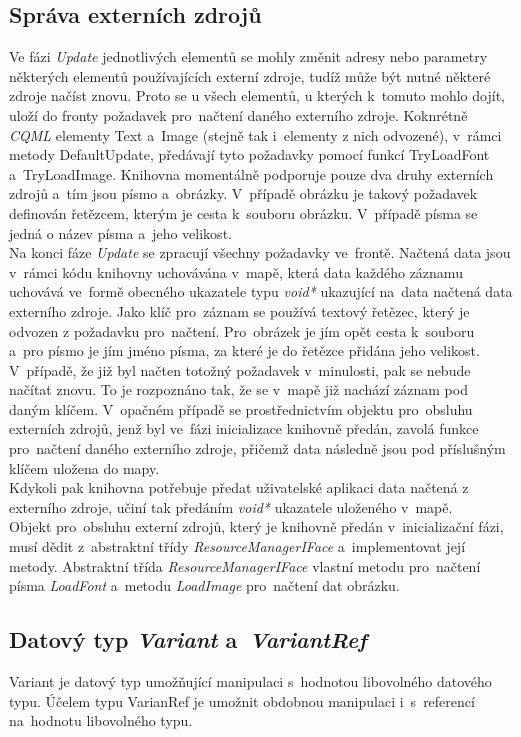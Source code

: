\documentclass[11pt,twoside,a4paper]{book}
\begin{document}
\subsection{\label{sec:ext}Správa externích zdrojů}
Ve fázi \textit{Update} jednotlivých elementů se mohly změnit adresy nebo parametry některých elementů používajících externí zdroje, tudíž může být nutné některé zdroje načíst znovu. Proto se u všech elementů, u kterých k~tomuto mohlo dojít, uloží do fronty požadavek pro~načtení daného externího zdroje. Koknrétně \textit{CQML} elementy Text a~Image (stejně tak i~elementy z nich odvozené), v~rámci metody DefaultUpdate, předávají tyto požadavky pomocí funkcí TryLoadFont a~TryLoadImage. Knihovna momentálně podporuje pouze dva druhy externích zdrojů a~tím jsou písmo a~obrázky. V~případě obrázku je takový požadavek definován řetězcem, kterým je cesta k~souboru obrázku. V~případě písma se jedná o název písma a~jeho velikost. \\
Na konci fáze \textit{Update} se zpracují všechny požadavky ve~frontě. Načtená data jsou v~rámci kódu knihovny uchovávána v~mapě, která data každého záznamu uchovává ve~formě obecného ukazatele typu \textit{void*} ukazující na~data načtená data externího zdroje. Jako klíč pro~záznam se používá textový řetězec, který je odvozen z požadavku pro~načtení. Pro~obrázek je jím opět cesta k~souboru a~pro písmo je jím jméno písma, za které je do řetězce přidána jeho velikost. V~případě, že již byl načten totožný požadavek v~minulosti, pak se nebude načítat znovu. To je rozpoznáno tak, že se v~mapě již nachází záznam pod daným klíčem. V~opačném případě se prostřednictvím objektu pro~obsluhu externích zdrojů, jenž byl ve~fázi inicializace knihovně předán, zavolá funkce pro~načtení daného externího zdroje, přičemž data následně jsou pod příslušným klíčem uložena do mapy.\\
Kdykoli pak knihovna potřebuje předat uživatelské aplikaci data načtená z externího zdroje, učiní tak předáním \textit{void*} ukazatele uloženého v~mapě.\\
Objekt pro~obsluhu externí zdrojů, který je knihovně předán v~inicializační fázi, musí dědit z~abstraktní třídy \textit{ResourceManagerIFace} a~implementovat její metody. Abstraktní třída \textit{ResourceManagerIFace} vlastní metodu pro~načtení písma \textit{LoadFont} a~metodu \textit{LoadImage} pro~načtení dat obrázku.

\subsection{Datový typ \textit{Variant} a~\textit{VariantRef}}
Variant je datový typ umožňující manipulaci s~hodnotou libovolného datového typu. Účelem typu VarianRef je umožnit obdobnou manipulaci i~s~referencí na~hodnotu libovolného typu.\\
\end{document}
